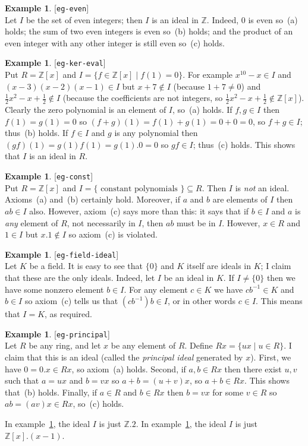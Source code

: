 \documentclass{amsart}
\newcommand{\lbl}[1]{\label{#1}\textup{[\texttt{#1}]}\ \\}
\newcommand{\lbl}{\label}
\newcommand{\Z}         {{\mathbb{Z}}}
\newcommand{\sse}       {\subseteq}
\newcommand{\st}        {\;|\;}
\newcommand{\half}      {{\textstyle\frac{1}{2}}}
\renewcommand{\:}{\colon}
\theoremstyle{definition}
\newtheorem{example}[theorem]{Example}
\begin{document}
\begin{example}\lbl{eg-even}
 Let $I$ be the set of even integers; then $I$ is an ideal in $\Z$.
 Indeed, $0$ is even so~(a) holds; the sum of two even integers is
 even so~(b) holds; and the product of an even integer with any other
 integer is still even so~(c) holds.
\end{example}
\begin{example}\lbl{eg-ker-eval}
 Put $R=\Z[x]$ and $I=\{f\in\Z[x]\st f(1)=0\}$.  For example
 $x^{10}-x\in I$ and $(x-3)(x-2)(x-1)\in I$ but $x+7\not\in I$
 (because $1+7\neq 0$) and $\half x^2-x+\half\not\in I$ (because the
 coefficients are not integers, so $\half x^2-x+\half\not\in\Z[x]$).
 Clearly the zero polynomial is an element of $I$, so~(a) holds.  If
 $f,g\in I$ then $f(1)=g(1)=0$ so $(f+g)(1)=f(1)+g(1)=0+0=0$, so
 $f+g\in I$; thus~(b) holds.  If $f\in I$ and $g$ is any polynomial
 then $(gf)(1)=g(1)f(1)=g(1).0=0$ so $gf\in I$; thus~(c) holds.  This
 shows that $I$ is an ideal in $R$.
\end{example}
\begin{example}\lbl{eg-const}
 Put $R=\Z[x]$ and $I=\{\text{ constant polynomials }\}\sse R$.
 Then $I$ is \emph{not} an ideal.  Axioms~(a) and~(b) certainly hold.
 Moreover, if $a$ and $b$ are elements of $I$ then $ab\in I$ also.
 However, axiom~(c) says more than this: it says that if $b\in I$ and
 $a$ is \emph{any} element of $R$, not necessarily in $I$, then $ab$
 must be in $I$.  However, $x\in R$ and $1\in I$ but $x.1\not\in I$ so
 axiom~(c) is violated.
\end{example}
\begin{example}\lbl{eg-field-ideal}
 Let $K$ be a field.  It is easy to see that $\{0\}$ and $K$ itself
 are ideals in $K$; I claim that these are the only ideals.  Indeed,
 let $I$ be an ideal in $K$.  If $I\neq\{0\}$ then we have some
 nonzero element $b\in I$.  For any element $c\in K$ we have
 $cb^{-1}\in K$ and $b\in I$ so axiom~(c) tells us that
 $(cb^{-1})b\in I$, or in other words $c\in I$.  This means that
 $I=K$, as required.
\end{example}
\begin{example}\lbl{eg-principal}
 Let $R$ be any ring, and let $x$ be any element of $R$.  Define
 $Rx=\{ux\st u\in R\}$.  I claim that this is an ideal (called the
 \emph{principal ideal} generated by $x$).  First, we have $0=0.x\in
 Rx$, so axiom~(a) holds.  Second, if $a,b\in Rx$ then there exist
 $u,v$ such that $a=ux$ and $b=vx$ so $a+b=(u+v)x$, so $a+b\in Rx$.
 This shows that~(b) holds.  Finally, if $a\in R$ and $b\in Rx$ then
 $b=vx$ for some $v\in R$ so $ab=(av)x\in Rx$, so~(c) holds. 

 In example~\ref{eg-even}, the ideal $I$ is just $\Z.2$.  In
 example~\ref{eg-ker-eval}, the ideal $I$ is just $\Z[x].(x-1)$.
\end{example}
\end{document}
